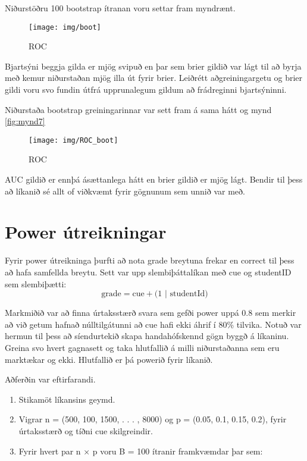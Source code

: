 \documentclass[
  10pt,
]{article}
\begin{document}
Niðurstöðru 100 bootstrap ítranan voru settar fram myndrænt.

\begin{figure}[H]

{\centering \texttt{[image: img/boot]} 

}

\caption{ROC}\label{fig:unnamed-chunk-12}
\end{figure}

Bjartsýni beggja gilda er mjög svipuð en þar sem brier gildið var lágt til að byrja með kemur niðurstaðan mjög illa út fyrir brier.
Leiðrétt aðgreiningargetu og brier gildi voru svo fundin útfrá upprunalegum gildum að frádreginni bjartsýninni.

Niðurstaða bootstrap greiningarinnar var sett fram á sama hátt og mynd \ref{fig:mynd7}

\begin{figure}[H]

{\centering \texttt{[image: img/ROC\_boot]} 

}

\caption{ROC}\label{fig:unnamed-chunk-13}
\end{figure}

AUC gildið er ennþá ásættanlega hátt en brier gildið er mjög lágt. Bendir til þess að líkanið sé allt of viðkvæmt fyrir gögnunum sem unnið var með.

\newpage

\hypertarget{power-uxfatreikningar}{%
\section{Power útreikningar}\label{power-uxfatreikningar}}

Fyrir power útreikninga þurfti að nota grade breytuna frekar en correct til þess að hafa samfellda breytu.
Sett var upp slembiþáttalíkan með cue og studentID sem slembiþætti: \[\mbox{grade} = \mbox{cue} + \mbox{(1 | studentId)}\]

Markmiðið var að finna úrtaksstærð svara sem gefði power uppá 0.8 sem merkir að við getum hafnað núlltilgátunni að cue hafi ekki áhrif í 80\% tilvika.
Notuð var hermun til þess að síendurtekið skapa handahófskennd gögn byggð á líkaninu. Greina svo hvert gagnasett og taka hlutfallið á milli niðurstaðanna sem eru marktækar og ekki. Hlutfallið er þá powerið fyrir líkanið.

Aðferðin var eftirfarandi.

\begin{enumerate}
\def\labelenumi{\arabic{enumi}.}
\item
  Stikamöt líkansins geymd.
\item
  Vigrar n = (500, 100, 1500, . . . , 8000) og p = (0.05, 0.1, 0.15, 0.2), fyrir úrtaksstærð og tíðni cue skilgreindir.
\item
  Fyrir hvert par n × p voru B = 100 ítranir framkvæmdar þar sem:
\end{enumerate}
\end{document}
